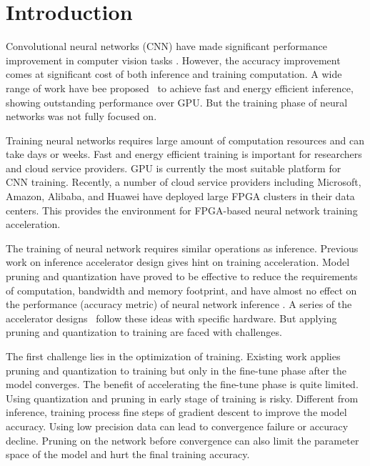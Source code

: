 \section{Introduction}\label{sec:introduction}

Convolutional neural networks (CNN) have made significant performance improvement in computer vision tasks \cite{He2016Deep, Shelhamer2017Fully}. However, the accuracy improvement comes at significant cost of both inference and training computation. A wide range of work have bee proposed~\cite{qiu2016going, han2017ese} to achieve fast and energy efficient inference, showing outstanding performance over GPU. But the training phase of neural networks was not fully focused on. 

Training neural networks requires large amount of computation resources and can take days or weeks. Fast and energy efficient training is important for researchers and cloud service providers. GPU is currently the most suitable platform for CNN training. Recently, a number of cloud service providers including Microsoft, Amazon, Alibaba, and Huawei have deployed large FPGA clusters in their data centers. This provides the environment for FPGA-based neural network training acceleration.

The training of neural network requires similar operations as inference. Previous work on inference accelerator design gives hint on training acceleration. Model pruning and quantization have proved to be effective to reduce the requirements of computation, bandwidth and memory footprint, and have almost no effect on the performance (accuracy metric) of neural network inference \cite{han2015deep}. A series of the accelerator designs~\cite{qiu2016going, han2017ese} follow these ideas with specific hardware. But applying pruning and quantization to training are faced with challenges.

The first challenge lies in the optimization of training. Existing work \cite{han2015deep} applies pruning and quantization to training but only in the fine-tune phase after the model converges. The benefit of accelerating the fine-tune phase is quite limited. Using quantization and pruning in early stage of training is risky. Different from inference, training process fine steps of gradient descent to improve the model accuracy. Using low precision data can lead to convergence failure or accuracy decline. Pruning on the network before convergence can also limit the parameter space of the model and hurt the final training accuracy. 

